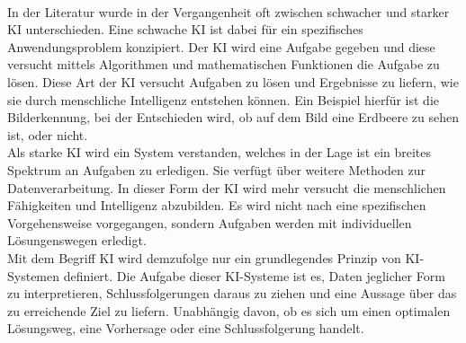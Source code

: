 \begin{onehalfspace}
        \\
        In der Literatur wurde in der Vergangenheit oft zwischen \glqq{}schwacher\grqq{} und \glqq{}starker\grqq{} \ac{KI} unterschieden. Eine schwache \ac{KI} ist dabei für ein spezifisches Anwendungsproblem konzipiert. Der \ac{KI} wird eine Aufgabe gegeben und diese versucht mittels Algorithmen und mathematischen Funktionen die Aufgabe zu lösen. Diese Art der \ac{KI} versucht Aufgaben zu lösen und Ergebnisse zu liefern, wie sie durch menschliche Intelligenz entstehen können.\cite{Lis2019} Ein Beispiel hierfür ist die Bilderkennung, bei der Entschieden wird, ob auf dem Bild eine Erdbeere zu sehen ist, oder nicht.
        \\
        Als starke \ac{KI} wird ein System verstanden, welches in der Lage ist ein breites Spektrum an Aufgaben zu erledigen.\cite{Datenkommission2019} Sie verfügt über weitere Methoden zur Datenverarbeitung. In dieser Form der \ac{KI} wird mehr versucht die menschlichen Fähigkeiten und Intelligenz abzubilden. Es wird nicht nach eine spezifischen Vorgehensweise vorgegangen, sondern Aufgaben werden mit individuellen Lösungenswegen erledigt.\cite{Lis2019}
        \\
        Mit dem Begriff \ac{KI} wird demzufolge nur ein grundlegendes Prinzip von \ac*{KI}-Systemen definiert. Die Aufgabe dieser \ac*{KI}-Systeme ist es, Daten jeglicher Form zu interpretieren, Schlussfolgerungen daraus zu ziehen und eine Aussage über das zu erreichende Ziel zu liefern. Unabhängig davon, ob es sich um einen optimalen Lösungsweg, eine Vorhersage oder eine Schlussfolgerung handelt. \cite{HEGKI2019Definition}    
    

\end{onehalfspace}
